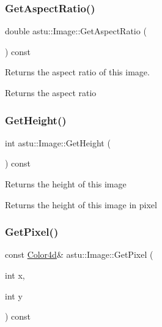 \subsubsection{\texorpdfstring{Get\+Aspect\+Ratio()}{GetAspectRatio()}}
{\footnotesize\ttfamily double astu\+::\+Image\+::\+Get\+Aspect\+Ratio (\begin{DoxyParamCaption}{ }\end{DoxyParamCaption}) const\hspace{0.3cm}{\ttfamily [inline]}}

Returns the aspect ratio of this image.

\begin{DoxyReturn}{Returns}
the aspect ratio 
\end{DoxyReturn}
\mbox{\label{classastu_1_1Image_ad64d3b2abc18e54ba8beb4e212a75a10}} 
\subsubsection{\texorpdfstring{Get\+Height()}{GetHeight()}}
{\footnotesize\ttfamily int astu\+::\+Image\+::\+Get\+Height (\begin{DoxyParamCaption}{ }\end{DoxyParamCaption}) const\hspace{0.3cm}{\ttfamily [inline]}}

Returns the height of this image

\begin{DoxyReturn}{Returns}
the height of this image in pixel 
\end{DoxyReturn}
\mbox{\label{classastu_1_1Image_ab1e0df707f4ededc00ebf61388b661a3}} 
\subsubsection{\texorpdfstring{Get\+Pixel()}{GetPixel()}\hspace{0.1cm}{\footnotesize\ttfamily [1/2]}}
{\footnotesize\ttfamily const \hyperlink{classastu_1_1Color}{Color4d}\& astu\+::\+Image\+::\+Get\+Pixel (\begin{DoxyParamCaption}\item[{int}]{x,  }\item[{int}]{y }\end{DoxyParamCaption}) const}

